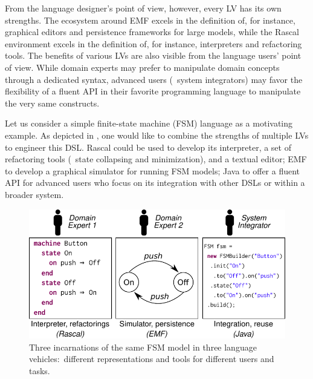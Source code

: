From the language designer's point of view, however, every LV has its own strengths.
The ecosystem around EMF excels in the definition of, for instance, graphical editors and persistence frameworks for large models, while the Rascal environment excels in the definition of, for instance, interpreters and refactoring tools.
The benefits of various LVs are also visible from the language users' point of view.
While domain experts may prefer to manipulate domain concepts through a dedicated syntax, advanced users (\eg~system integrators) may favor the flexibility of a fluent API in their favorite programming language to manipulate the very same constructs.

Let us consider a simple finite-state machine (FSM) language as a motivating example.
As depicted in , one would like to combine the strengths of multiple LVs to engineer this DSL.
Rascal could be used to develop its interpreter, a set of refactoring tools (\eg~state collapsing and minimization), and a textual editor; EMF to develop a graphical simulator for running FSM models; Java to offer a fluent API for advanced users who focus on its integration with other DSLs or within a broader system.

\begin{figure}[bt]
	\centering
	\includegraphics[width=\columnwidth]{figures/motivating-fsm-simplified-2}
	\caption{Three incarnations of the same FSM model in three language vehicles:~different representations and tools for different users and tasks.}
	\label{fig:motivating-fsm}
\end{figure}

